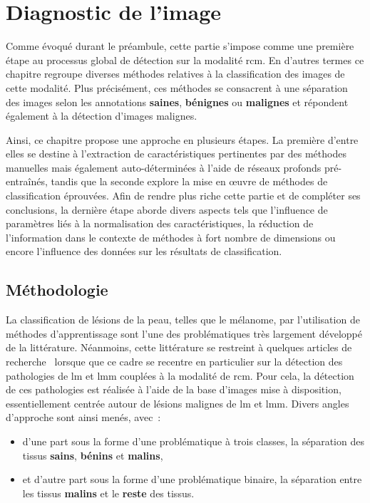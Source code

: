 \renewcommand{\thechapter}{\arabic{chapter}}
\setcounter{chapter}{5}

\chapter{Diagnostic de l'image}
\label{chap:chapter_5}
\chapterintro
Comme évoqué durant le préambule, cette partie s'impose comme une première étape au processus global de détection sur la modalité \gls{rcm}. En d'autres termes ce chapitre regroupe diverses méthodes relatives à la classification des images de cette modalité. Plus précisément, ces méthodes se consacrent à une séparation des images selon les annotations \textbf{saines}, \textbf{bénignes} ou \textbf{malignes} et répondent également à la détection d'images malignes.\par

Ainsi, ce chapitre propose une approche en plusieurs étapes. La première d'entre elles se destine à l'extraction de caractéristiques pertinentes par des méthodes manuelles mais également auto-déterminées à l'aide de réseaux profonds pré-entraînés, tandis que la seconde explore la mise en œuvre de méthodes de classification éprouvées. Afin de rendre plus riche cette partie et de compléter ses conclusions, la dernière étape aborde divers aspects tels que l'influence de paramètres liés à la normalisation des caractéristiques, la réduction de l'information dans le contexte de méthodes à fort nombre de dimensions ou encore l'influence des données sur les résultats de classification.\par	
\newpage

\section{Méthodologie}
La classification de lésions de la peau, telles que le mélanome, par l'utilisation de méthodes d'apprentissage sont l'une des problématiques très largement développé de la littérature. Néanmoins, cette littérature se restreint à quelques articles de recherche~\cite{Halimi2017a, Halimi2017b, Wiltgen2008, Koller2011} lorsque que ce cadre se recentre en particulier sur la détection des pathologies de \gls{lm} et \gls{lmm} couplées à la modalité de \gls{rcm}. Pour cela, la détection de ces pathologies est réalisée à l'aide de la base d'images mise à disposition, essentiellement centrée autour de lésions malignes de \gls{lm} et \gls{lmm}. Divers angles d'approche sont ainsi menés, avec~: 
\begin{itemize}
    \item d'une part sous la forme d'une problématique à trois classes, la séparation des tissus \textbf{sains}, \textbf{bénins} et \textbf{malins},
    \item et d'autre part sous la forme d'une problématique binaire, la séparation entre les tissus \textbf{malins} et le \textbf{reste} des tissus.
\end{itemize}\par


